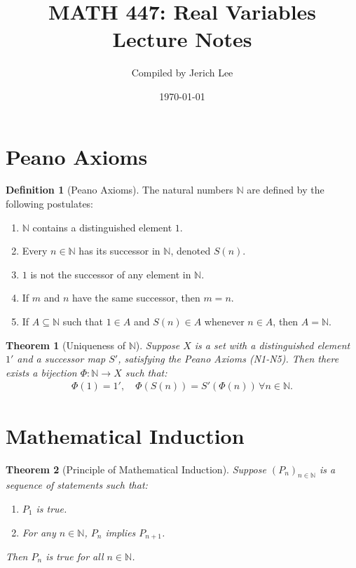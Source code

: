 \documentclass[9pt]{article}
\title{MATH 447: Real Variables \\ Lecture Notes}
\author{Compiled by Jerich Lee}
\date{\today}
\theoremstyle{definition}
\newtheorem{definition}{Definition}
\theoremstyle{plain}
\newtheorem{theorem}{Theorem}
\begin{document}
\maketitle

\section*{Peano Axioms}
\begin{definition}[Peano Axioms]
The natural numbers \( \mathbb{N} \) are defined by the following postulates:
\begin{enumerate}[label=(N\arabic*)]
    \item \( \mathbb{N} \) contains a distinguished element \( 1 \).
    \item Every \( n \in \mathbb{N} \) has its successor in \( \mathbb{N} \), denoted \( S(n) \).
    \item \( 1 \) is not the successor of any element in \( \mathbb{N} \).
    \item If \( m \) and \( n \) have the same successor, then \( m = n \).
    \item If \( A \subseteq \mathbb{N} \) such that \( 1 \in A \) and \( S(n) \in A \) whenever \( n \in A \), then \( A = \mathbb{N} \).
\end{enumerate}
\end{definition}

\begin{theorem}[Uniqueness of \( \mathbb{N} \)]
Suppose \( X \) is a set with a distinguished element \( 1' \) and a successor map \( S' \), satisfying the Peano Axioms (N1-N5). Then there exists a bijection \( \Phi : \mathbb{N} \to X \) such that:
\begin{align*}
    \Phi(1) = 1', \quad \Phi(S(n)) = S'(\Phi(n)) \, \forall n \in \mathbb{N}.
\end{align*}
\end{theorem}

\section*{Mathematical Induction}
\begin{theorem}[Principle of Mathematical Induction]
Suppose \( (P_n)_{n \in \mathbb{N}} \) is a sequence of statements such that:
\begin{enumerate}
    \item \( P_1 \) is true.
    \item For any \( n \in \mathbb{N} \), \( P_n \) implies \( P_{n+1} \).
\end{enumerate}
Then \( P_n \) is true for all \( n \in \mathbb{N} \).
\end{theorem}
\end{document}

